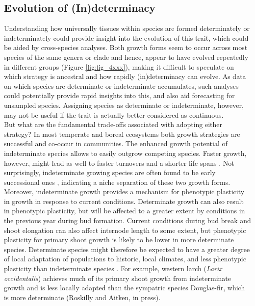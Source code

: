 \documentclass{article}
\begin{document}
	\subsection*{Evolution of (In)determinacy}
	Understanding how universally tissues within species are formed determinately or indeterminately could provide insight into the evolution of this trait, which could be aided by cross-species analyses. Both growth forms seem to occur across most species of the same genera or clade and hence, appear to have evolved repeatedly in different groups (Figure \ref{fig:fig_4xxx}), making it difficult to speculate on which strategy is ancestral \citep[but see][]{hariharanIndeterminateGrowthCould2016} and how rapidly (in)determinacy can evolve. As data on which species are determinate or indeterminate accumulates, such analyses could potentially provide rapid insights into this, and also aid forecasting for unsampled species. Assigning species as determinate or indeterminate, however, may not be useful if the trait is actually better considered as continuous. \\

	But what are the fundamental trade-offs associated with adopting either strategy? In most temperate and boreal ecosystems both growth strategies are successful and co-occur in communities. The enhanced growth potential of indeterminate species allows to easily outgrow competing species. Faster growth, however, might lead as well to faster turnovers and a shorter life spans \citep{brienenForestCarbonSink2020b, milletRelationshipArchitectureSuccessional1999}. Not surprisingly, indeterminate growing species are often found to be early successional ones \citep{marksRelationExtensionGrowth1975, boojhGrowthStrategyTrees1982}, indicating a niche separation of these two growth forms. 
	Moreover, indeterminate growth provides a mechanism for phenotypic plasticity in growth in response to current conditions. Determinate growth can also result in phenotypic plasticity, but will be affected to a greater extent by conditions in the previous year during bud formation. Current conditions during bud break and shoot elongation can also affect internode length to some extent, but phenotypic plasticity for primary shoot growth is likely to be lower in more determinate species. Determinate species might therefore be expected to have a greater degree of local adaptation of populations to historic, local climates, and less phenotypic plasticity than indeterminate species \citep{leitesForestTreeSpecies2023}. For example, western larch (\textit{Larix occidentalis}) achieves much of its primary shoot growth from indeterminate growth %
	and is less locally adapted than the sympatric species Douglas-fir, which is more determinate (Roskilly and Aitken, in press).\\
\end{document}
